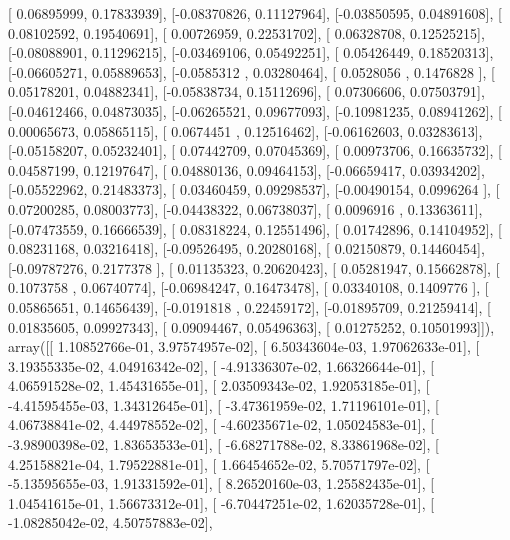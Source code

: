 \documentclass{article}
\begin{document}
       [ 0.06895999,  0.17833939],
       [-0.08370826,  0.11127964],
       [-0.03850595,  0.04891608],
       [ 0.08102592,  0.19540691],
       [ 0.00726959,  0.22531702],
       [ 0.06328708,  0.12525215],
       [-0.08088901,  0.11296215],
       [-0.03469106,  0.05492251],
       [ 0.05426449,  0.18520313],
       [-0.06605271,  0.05889653],
       [-0.0585312 ,  0.03280464],
       [ 0.0528056 ,  0.1476828 ],
       [ 0.05178201,  0.04882341],
       [-0.05838734,  0.15112696],
       [ 0.07306606,  0.07503791],
       [-0.04612466,  0.04873035],
       [-0.06265521,  0.09677093],
       [-0.10981235,  0.08941262],
       [ 0.00065673,  0.05865115],
       [ 0.0674451 ,  0.12516462],
       [-0.06162603,  0.03283613],
       [-0.05158207,  0.05232401],
       [ 0.07442709,  0.07045369],
       [ 0.00973706,  0.16635732],
       [ 0.04587199,  0.12197647],
       [ 0.04880136,  0.09464153],
       [-0.06659417,  0.03934202],
       [-0.05522962,  0.21483373],
       [ 0.03460459,  0.09298537],
       [-0.00490154,  0.0996264 ],
       [ 0.07200285,  0.08003773],
       [-0.04438322,  0.06738037],
       [ 0.0096916 ,  0.13363611],
       [-0.07473559,  0.16666539],
       [ 0.08318224,  0.12551496],
       [ 0.01742896,  0.14104952],
       [ 0.08231168,  0.03216418],
       [-0.09526495,  0.20280168],
       [ 0.02150879,  0.14460454],
       [-0.09787276,  0.2177378 ],
       [ 0.01135323,  0.20620423],
       [ 0.05281947,  0.15662878],
       [ 0.1073758 ,  0.06740774],
       [-0.06984247,  0.16473478],
       [ 0.03340108,  0.1409776 ],
       [ 0.05865651,  0.14656439],
       [-0.0191818 ,  0.22459172],
       [-0.01895709,  0.21259414],
       [ 0.01835605,  0.09927343],
       [ 0.09094467,  0.05496363],
       [ 0.01275252,  0.10501993]]), array([[  1.10852766e-01,   3.97574957e-02],
       [  6.50343604e-03,   1.97062633e-01],
       [  3.19355335e-02,   4.04916342e-02],
       [ -4.91336307e-02,   1.66326644e-01],
       [  4.06591528e-02,   1.45431655e-01],
       [  2.03509343e-02,   1.92053185e-01],
       [ -4.41595455e-03,   1.34312645e-01],
       [ -3.47361959e-02,   1.71196101e-01],
       [  4.06738841e-02,   4.44978552e-02],
       [ -4.60235671e-02,   1.05024583e-01],
       [ -3.98900398e-02,   1.83653533e-01],
       [ -6.68271788e-02,   8.33861968e-02],
       [  4.25158821e-04,   1.79522881e-01],
       [  1.66454652e-02,   5.70571797e-02],
       [ -5.13595655e-03,   1.91331592e-01],
       [  8.26520160e-03,   1.25582435e-01],
       [  1.04541615e-01,   1.56673312e-01],
       [ -6.70447251e-02,   1.62035728e-01],
       [ -1.08285042e-02,   4.50757883e-02],
\end{document}
